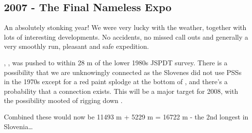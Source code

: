 \begin{tcolorbox}
\chapter{2007 - The Final Nameless Expo}
An absolutely stonking year! We were very lucky with the weather, together with lots of interesting developments. No accidents, no missed call outs and generally a very smoothly run, pleasant and safe expedition.

, , was pushed to within 28 m of the lower  1980s JSPDT survey. There is a possibility that we are unknowingly connected as the Slovenes did not use PSSs in the 1970s except for a red paint splodge at the bottom of , and there's a probability that a connection exists. This will be a major target for 2008, with the possibility mooted of rigging down .

Combined these would now be 11493 m + 5229 m = 16722 m - the 2nd longest in Slovenia\ldots{}

\end{tcolorbox}
\BgThispage

